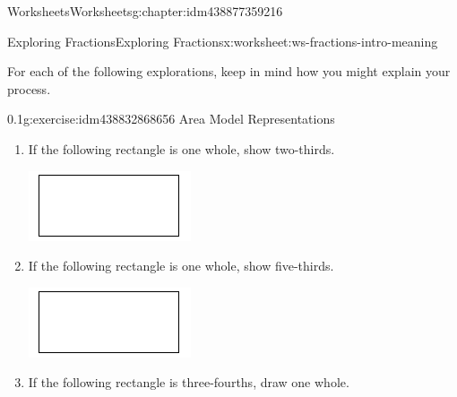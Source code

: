 \documentclass[twoside,11pt,]{book}
\begin{document}
\begin{chapterptx}{Worksheets}{}{Worksheets}{}{}{g:chapter:idm438877359216}
\begin{worksheet-section-numberless}{Exploring Fractions}{}{Exploring Fractions}{}{}{x:worksheet:ws-fractions-intro-meaning}
\begin{introduction}{}
For each of the following explorations, keep in mind how you might explain your process.%
\end{introduction}%
\begin{divisionexercise}{1}{}{0.1}{g:exercise:idm438832868656}%
Area Model Representations%
\leavevmode%
\begin{enumerate}[label=(\alph*)]
\item{}If the following rectangle is one whole, show two-thirds. \leavevmode%
\begin{sidebyside}{1}{0.3}{0.3}{0}%
\begin{sbspanel}{0.4}%
\includegraphics[width=1\linewidth]{images/generic-rectangle.png}
\end{sbspanel}%
\end{sidebyside}%
%
\item{}If the following rectangle is one whole, show five-thirds. \leavevmode%
\begin{sidebyside}{1}{0.3}{0.3}{0}%
\begin{sbspanel}{0.4}%
\includegraphics[width=1\linewidth]{images/generic-rectangle.png}
\end{sbspanel}%
\end{sidebyside}%
%
\item{}If the following rectangle is three-fourths, draw one whole. \leavevmode%
\begin{sidebyside}{1}{0.35}{0.35}{0}%
\begin{sbspanel}{0.3}%

\end{sbspanel}
\end{sidebyside}
\end{enumerate}
\end{divisionexercise}
\end{worksheet-section-numberless}
\end{chapterptx}
\end{document}
